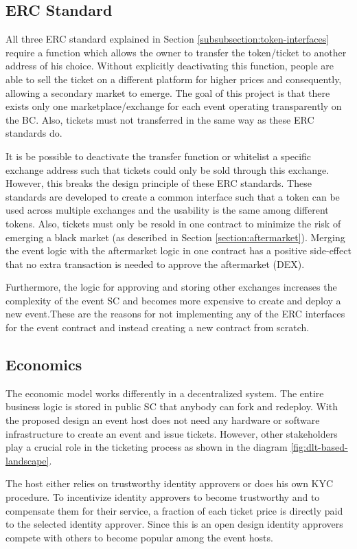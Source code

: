 \subsection{ERC Standard}
All three ERC standard explained in Section \ref{subsubsection:token-interfaces} require a function which allows the owner to transfer the token/ticket to another address of his choice. Without explicitly deactivating this function, people are able to sell the ticket on a different platform for higher prices and consequently, allowing a secondary market to emerge. The goal of this project is that there exists only one marketplace/exchange for each event operating transparently on the BC. Also, tickets must not transferred in the same way as these ERC standards do.

It is be possible to deactivate the transfer function or whitelist a specific exchange address such that tickets could only be sold through this exchange. However, this breaks the design principle of these ERC standards. These standards are developed to create a common interface such that a token can be used across multiple exchanges and the usability is the same among different tokens. Also, tickets must only be resold in one contract to minimize the risk of emerging a black market (as described in Section \ref{section:aftermarket}). Merging the event logic with the aftermarket logic in one contract has a positive side-effect that no extra transaction is needed to approve the aftermarket (DEX). 

Furthermore, the logic for approving and storing other exchanges increases the complexity of the event SC and becomes more expensive to create and deploy a new event.These are the reasons for not implementing any of the ERC interfaces for the event contract and instead creating a new contract from scratch. 


\subsection{Economics}\label{design:economy}

The economic model works differently in a decentralized system. The entire business logic is stored in public SC that anybody can fork and redeploy. With the proposed design an event host does not need any hardware or software infrastructure to create an event and issue tickets. However, other stakeholders play a crucial role in the ticketing process as shown in the diagram \ref{fig:dlt-based-landscape}.

The host either relies on trustworthy identity approvers or does his own KYC procedure. To incentivize identity approvers to become trustworthy and to compensate them for their service, a fraction of each ticket price is directly paid to the selected identity approver. Since this is an open design identity approvers compete with others to become popular among the event hosts.

